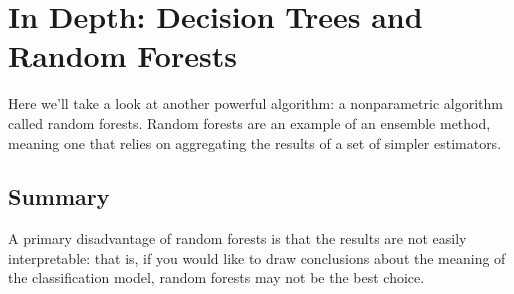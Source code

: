 \chapter{In Depth: Decision Trees and Random Forests\label{Ch44}}
Here we'll take a look at another powerful algorithm: a nonparametric
algorithm called random forests. Random forests are an example of an ensemble
method, meaning one that relies on aggregating the results of a set of simpler estimators.

\section{Summary}
A primary disadvantage of random forests is that the results are not easily interpretable: that is, if you would like to draw conclusions about the meaning of the classification model, random forests may not be the best choice.

